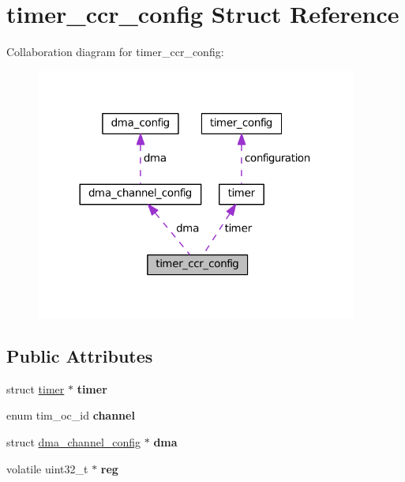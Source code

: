 \hypertarget{structtimer__ccr__config}{}\section{timer\+\_\+ccr\+\_\+config Struct Reference}
\label{structtimer__ccr__config}


Collaboration diagram for timer\+\_\+ccr\+\_\+config\+:\nopagebreak
\begin{figure}[H]
\begin{center}
\leavevmode
\includegraphics[width=300pt]{structtimer__ccr__config__coll__graph}
\end{center}
\end{figure}
\subsection*{Public Attributes}
\begin{DoxyCompactItemize}
\item 
\hypertarget{structtimer__ccr__config_af228e92c83395be0dff9f27e6ba7711a}{}struct \hyperlink{structtimer}{timer} $\ast$ {\bfseries timer}\label{structtimer__ccr__config_af228e92c83395be0dff9f27e6ba7711a}

\item 
\hypertarget{structtimer__ccr__config_ae497ec8b539565c6fe34b2849989336a}{}enum tim\+\_\+oc\+\_\+id {\bfseries channel}\label{structtimer__ccr__config_ae497ec8b539565c6fe34b2849989336a}

\item 
\hypertarget{structtimer__ccr__config_a1e92f7221c14d90562bd42830fa2427d}{}struct \hyperlink{structdma__channel__config}{dma\+\_\+channel\+\_\+config} $\ast$ {\bfseries dma}\label{structtimer__ccr__config_a1e92f7221c14d90562bd42830fa2427d}

\item 
\hypertarget{structtimer__ccr__config_a3876bca410f69a23790a94f8eb9d73f8}{}volatile uint32\+\_\+t $\ast$ {\bfseries reg}\label{structtimer__ccr__config_a3876bca410f69a23790a94f8eb9d73f8}

\end{DoxyCompactItemize}


